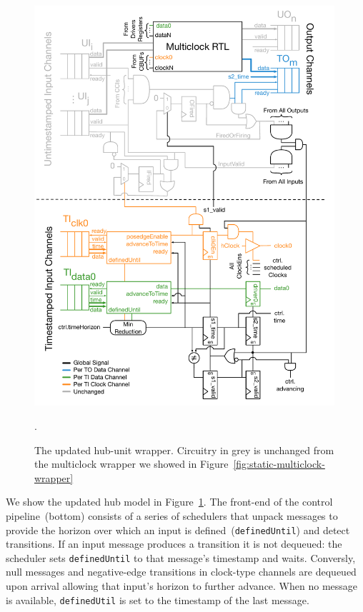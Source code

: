 \begin{figure}
    \centering
    \includegraphics[width=0.99\textwidth]{figures/pdes-wrapper.pdf}
    \caption{The updated hub-unit wrapper. Circuitry in grey is unchanged from the multiclock
    wrapper we showed in Figure~\ref{fig:static-multiclock-wrapper}}.
    \label{fig:pdes-wrapper}
\end{figure}

We show the updated hub model in Figure~\ref{fig:pdes-wrapper}. The front-end
of the control pipeline~(bottom) consists of a series of schedulers that
unpack messages to provide the horizon over which an input is
defined~(\texttt{definedUntil}) and detect transitions.  If an input message
produces a transition it is not dequeued: the scheduler sets
\texttt{definedUntil} to that message's timestamp and waits. Conversly, null
messages and negative-edge transitions in clock-type channels are dequeued
upon arrival allowing that input's horizon to further advance. When no message is available,
\texttt{definedUtil} is set to the timestamp of the last message.

